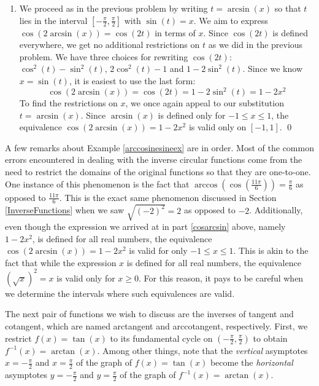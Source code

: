 \begin{ex}
\begin{enumerate}
\begin{enumerate}
\item We proceed as in the previous problem by writing $t = \arcsin(x)$ so that $t$ lies in the interval $\left[ -\frac{\pi}{2}, \frac{\pi}{2}\right]$ with $\sin(t) = x$.  We aim to express $\cos\left(2 \arcsin(x)\right) = \cos(2t)$ in terms of $x$.  Since $\cos(2t)$ is defined everywhere, we get no additional restrictions on $t$ as we did in the previous problem.  We have three choices for rewriting $\cos(2t)$:  $\cos^{2}(t) - \sin^{2}(t)$, $2\cos^{2}(t) - 1$ and $1 - 2\sin^{2}(t)$.  Since we know $x = \sin(t)$, it is easiest to use the last form: \[\cos\left(2 \arcsin(x)\right) = \cos(2t)  = 1 - 2\sin^{2}(t) = 1 - 2x^2\]  To find the restrictions on $x$, we once again appeal to our substitution $t = \arcsin(x)$.  Since $\arcsin(x)$ is defined only for $-1 \leq x \leq 1$, the equivalence $\cos\left(2 \arcsin(x)\right) = 1-2x^2$ is valid only on $[-1,1]$. \qed

\end{enumerate}

\end{enumerate}

\end{ex}


A few remarks about Example \ref{arccosinesineex} are in order.  Most of the common errors encountered in dealing with the inverse circular functions come from the need to restrict the domains of the original functions so that they are one-to-one.  One instance of this phenomenon is the fact that $\arccos\left( \cos\left(\frac{11\pi}{6}\right)\right) = \frac{\pi}{6}$ as opposed to $\frac{11\pi}{6}$. This is the exact same phenomenon discussed in Section \ref{InverseFunctions} when we saw  $\sqrt{(-2)^2} = 2$ as opposed to $-2$.    Additionally, even though the expression we arrived at in part \ref{cosarcsin} above, namely $1 - 2x^2$, is defined for all real numbers, the equivalence  $\cos\left(2 \arcsin(x)\right) = 1-2x^2$ is valid for only $-1 \leq x \leq 1$.  This is akin to the fact that while the expression $x$ is defined for all real numbers, the equivalence $\left( \sqrt{x} \right)^2 = x$ is valid only for $x \geq 0$.  For this reason, it pays to be careful when we determine the intervals where such equivalences are valid.

\bigskip

The next pair of functions we wish to discuss are the inverses of tangent and cotangent, which are named arctangent and arccotangent, respectively.  First, we restrict $f(x) = \tan(x)$ to its fundamental cycle on $\left(-\frac{\pi}{2}, \frac{\pi}{2}\right)$ to obtain $f^{-1}(x) = \arctan(x)$. Among other things, note that the \textit{vertical} asymptotes $x = -\frac{\pi}{2}$ and $x = \frac{\pi}{2}$ of the graph of $f(x) = \tan(x)$ become the \textit{horizontal} asymptotes $y = -\frac{\pi}{2}$ and $y = \frac{\pi}{2}$ of the graph of $f^{-1}(x) = \arctan(x)$.  

